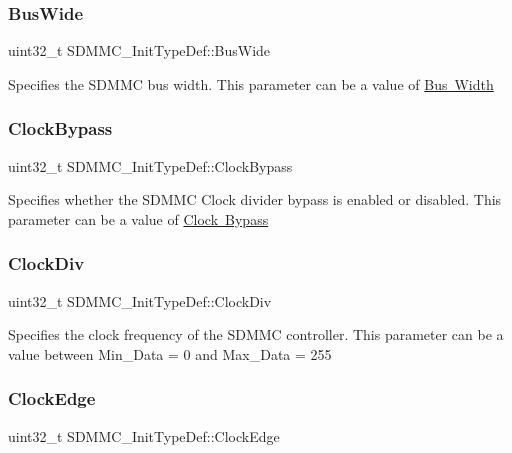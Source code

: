 \subsubsection{\texorpdfstring{BusWide}{BusWide}}
{\footnotesize\ttfamily uint32\+\_\+t S\+D\+M\+M\+C\+\_\+\+Init\+Type\+Def\+::\+Bus\+Wide}

Specifies the S\+D\+M\+MC bus width. This parameter can be a value of \mbox{\hyperlink{group___s_d_m_m_c___l_l___bus___wide}{Bus Width}} \mbox{\label{struct_s_d_m_m_c___init_type_def_a9283eaa673082cbb79274eabaf6ddbc9}} 
\subsubsection{\texorpdfstring{ClockBypass}{ClockBypass}}
{\footnotesize\ttfamily uint32\+\_\+t S\+D\+M\+M\+C\+\_\+\+Init\+Type\+Def\+::\+Clock\+Bypass}

Specifies whether the S\+D\+M\+MC Clock divider bypass is enabled or disabled. This parameter can be a value of \mbox{\hyperlink{group___s_d_m_m_c___l_l___clock___bypass}{Clock Bypass}} \mbox{\label{struct_s_d_m_m_c___init_type_def_a8f3083375d977df0ecd41bb622a6e683}} 
\subsubsection{\texorpdfstring{ClockDiv}{ClockDiv}}
{\footnotesize\ttfamily uint32\+\_\+t S\+D\+M\+M\+C\+\_\+\+Init\+Type\+Def\+::\+Clock\+Div}

Specifies the clock frequency of the S\+D\+M\+MC controller. This parameter can be a value between Min\+\_\+\+Data = 0 and Max\+\_\+\+Data = 255 \mbox{\label{struct_s_d_m_m_c___init_type_def_a999356b930b15af6c9ecf2c9eed89bb6}} 
\subsubsection{\texorpdfstring{ClockEdge}{ClockEdge}}
{\footnotesize\ttfamily uint32\+\_\+t S\+D\+M\+M\+C\+\_\+\+Init\+Type\+Def\+::\+Clock\+Edge}

